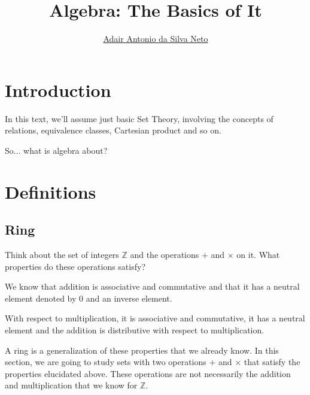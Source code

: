 \documentclass[12pt,a4paper]{article}
\author{\href{https://adairneto.github.io/}{Adair Antonio da Silva Neto}}
\title{Algebra: The Basics of It}
\theoremstyle{definition}
\begin{document}
\clearpage\maketitle
\thispagestyle{empty}

\newpage

\tableofcontents

\newpage
\clearpage
\setcounter{page}{1}

\section{Introduction}

In this text, we'll assume just basic Set Theory, involving the concepts of relations, equivalence classes, Cartesian product and so on.

So... what is algebra about?



\section{Definitions}

\subsection{Ring}\label{ring}

Think about the set of integers \(\mathbb{Z} \) and the operations \(+\) and \(\times\) on it. What properties do these operations satisfy?

We know that addition is associative and commutative and that it has a neutral element denoted by \(0\) and an inverse element.

With respect to multiplication, it is associative and commutative, it has a neutral element and the addition is distributive with respect to multiplication.

A ring is a generalization of these properties that we already know. In this section, we are going to study sets with two operations \(+\) and \(\times\) that satisfy the properties elucidated above. These operations are not necessarily the addition and multiplication that we know for \(\mathbb{Z}\).
\end{document}

